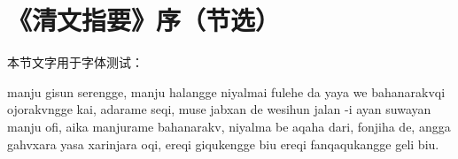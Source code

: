 \section*{《清文指要》序（节选）}

本节文字用于字体测试：

{\mj manju gisun serengge, manju halangge niyalmai fulehe da yaya we bahanarakvqi ojorakvngge kai, adarame seqi, muse jabxan de wesihun jalan -i ayan suwayan manju ofi, aika manjurame bahanarakv, niyalma be aqaha dari, fonjiha de, angga gahvxara yasa xarinjara oqi, ereqi giqukengge biu ereqi fanqaqukangge geli biu.}